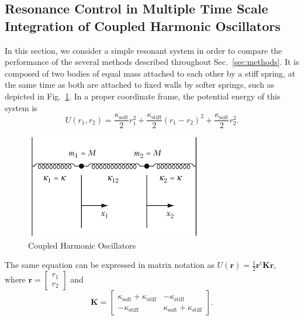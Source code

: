 \documentclass[
aip,
jcp,
reprint,
]{revtex4-1}
\newcommand{\mt}[1]{\boldsymbol{\mathbf{#1}}}          %
\newcommand{\vt}[1]{\boldsymbol{\mathbf{#1}}}          %
\newcommand{\tr}[1]{#1^\text{t}}                       %
\begin{document}
\subsection{Resonance Control in Multiple Time Scale Integration of Coupled Harmonic Oscillators}

In this section, we consider a simple resonant system in order to compare the performance of the several methods described throughout Sec.~\ref{sec:methods}.
It is composed of two bodies of equal mass attached to each other by a stiff spring, at the same time as both are attached to fixed walls by softer springs, such as depicted in Fig.~\ref{fig:coupled harmonic oscillators}.
In a proper coordinate frame, the potential energy of this system is
\begin{equation*}
U(r_1, r_2) = \frac{\kappa_\mathrm{soft}}{2} r_1^2 + \frac{\kappa_\mathrm{stiff}}{2} (r_1 - r_2)^2 + \frac{\kappa_\mathrm{soft}}{2} r_2^2.
\end{equation*}

\begin{figure}
	\includegraphics[width=0.9\hsize]{coupled_oscillators}
	\caption{Coupled Harmonic Oscillators}
	\label{fig:coupled harmonic oscillators}
\end{figure}

The same equation can be expressed in matrix notation as $U(\vt r) = \frac{1}{2} \tr{\vt r} \mt K \vt r$, where $\vt r = [\substack{r_1 \\ r_2}]$ and
\begin{equation*}
{\mt K} = \begin{bmatrix}
\kappa_\mathrm{soft} + \kappa_\mathrm{stiff} & -\kappa_\mathrm{stiff} \\
-\kappa_\mathrm{stiff} & \kappa_\mathrm{soft} + \kappa_\mathrm{stiff}
\end{bmatrix}.
\end{equation*}
\end{document}
